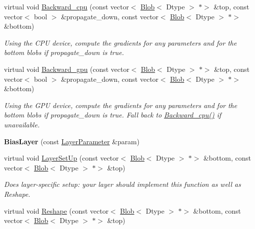 \begin{DoxyCompactItemize}
virtual void \mbox{\hyperlink{classcaffe_1_1_bias_layer_a644c6ae32fde130475b8de04db36ea5b}{Backward\+\_\+cpu}} (const vector$<$ \mbox{\hyperlink{classcaffe_1_1_blob}{Blob}}$<$ Dtype $>$ $\ast$$>$ \&top, const vector$<$ bool $>$ \&propagate\+\_\+down, const vector$<$ \mbox{\hyperlink{classcaffe_1_1_blob}{Blob}}$<$ Dtype $>$ $\ast$$>$ \&bottom)
\begin{DoxyCompactList}\small\item\em Using the C\+PU device, compute the gradients for any parameters and for the bottom blobs if propagate\+\_\+down is true. \end{DoxyCompactList}\item 
\mbox{\label{classcaffe_1_1_bias_layer_a879d979171c8f79f7b5b07b4d9e7945d}} 
virtual void \mbox{\hyperlink{classcaffe_1_1_bias_layer_a879d979171c8f79f7b5b07b4d9e7945d}{Backward\+\_\+gpu}} (const vector$<$ \mbox{\hyperlink{classcaffe_1_1_blob}{Blob}}$<$ Dtype $>$ $\ast$$>$ \&top, const vector$<$ bool $>$ \&propagate\+\_\+down, const vector$<$ \mbox{\hyperlink{classcaffe_1_1_blob}{Blob}}$<$ Dtype $>$ $\ast$$>$ \&bottom)
\begin{DoxyCompactList}\small\item\em Using the G\+PU device, compute the gradients for any parameters and for the bottom blobs if propagate\+\_\+down is true. Fall back to \mbox{\hyperlink{classcaffe_1_1_bias_layer_a644c6ae32fde130475b8de04db36ea5b}{Backward\+\_\+cpu()}} if unavailable. \end{DoxyCompactList}\item 
\mbox{\label{classcaffe_1_1_bias_layer_a12e9da7fe06423dd2aaa0d1aba1ae460}} 
{\bfseries Bias\+Layer} (const \mbox{\hyperlink{classcaffe_1_1_layer_parameter}{Layer\+Parameter}} \&param)
\item 
virtual void \mbox{\hyperlink{classcaffe_1_1_bias_layer_a2c9d072e5e641b247988f22be20520ea}{Layer\+Set\+Up}} (const vector$<$ \mbox{\hyperlink{classcaffe_1_1_blob}{Blob}}$<$ Dtype $>$ $\ast$$>$ \&bottom, const vector$<$ \mbox{\hyperlink{classcaffe_1_1_blob}{Blob}}$<$ Dtype $>$ $\ast$$>$ \&top)
\begin{DoxyCompactList}\small\item\em Does layer-\/specific setup\+: your layer should implement this function as well as Reshape. \end{DoxyCompactList}\item 
virtual void \mbox{\hyperlink{classcaffe_1_1_bias_layer_a00ab608f300c4fa94d75b15ab9e0c599}{Reshape}} (const vector$<$ \mbox{\hyperlink{classcaffe_1_1_blob}{Blob}}$<$ Dtype $>$ $\ast$$>$ \&bottom, const vector$<$ \mbox{\hyperlink{classcaffe_1_1_blob}{Blob}}$<$ Dtype $>$ $\ast$$>$ \&top)

\end{DoxyCompactItemize}
